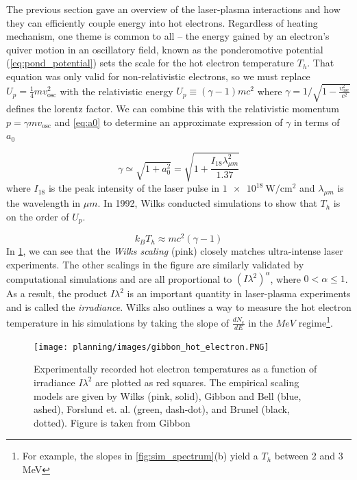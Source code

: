 The previous section gave an overview of the laser-plasma interactions and how they can efficiently couple energy into hot electrons. Regardless of heating mechanism, one theme is common to all -- the energy gained by an electron's quiver motion in an oscillatory field, known as the ponderomotive potential (\cref{eq:pond_potential}) sets the scale for the hot electron temperature $T_h$. That equation was only valid for non-relativistic electrons, so we must replace $U_p = \frac{1}{4} m v_\text{osc}^2$ with the relativistic energy $U_p \equiv (\gamma - 1) m c^2$ where $\gamma = 1 / \sqrt{1 - \frac{v_\text{osc}^2}{c^2}}$ defines the lorentz factor. We can combine this with the relativistic momentum $p = \gamma m v_\text{osc}$ and \cref{eq:a0} to determine an approximate expression of $\gamma$ in terms of $a_0$
	
\begin{equation}
	\gamma \simeq \sqrt{1 + a_0^2} = \sqrt{1 + \frac{I_{18} \lambda_{\mu m}^2}{1.37}} \label{eq:gamma}
\end{equation}
where $I_{18}$ is the peak intensity of the laser pulse in $\SI{1e18}{\watt \per \centi \meter \squared}$ and $\lambda_{\mu m}$ is the wavelength in $\mu m$. In 1992, Wilks \cite{Wilks_1992_PRL} conducted simulations to show that $T_h$ is on the order of $U_p$. 

\begin{equation}
	k_B T_h \approx m c^2 (\gamma - 1) \label{eq:wilks}
\end{equation}
In \cref{fig:electron_scaling}, we can see that the \emph{Wilks scaling} (pink) closely matches ultra-intense laser experiments. The other scalings in the figure are similarly validated by computational simulations and are all proportional to $(I \lambda^2)^\alpha$, where $0 < \alpha \leq 1$. As a result, the product $I \lambda^2$ is an important quantity in laser-plasma experiments and is called the \emph{irradiance}. Wilks also outlines a way to measure the hot electron temperature in his simulations \cite{Wilks_1992_PRL} by taking the slope of $\frac{dN_e}{dE}$ in the $MeV$ regime\footnote{For example, the slopes in \autoref{fig:sim_spectrum}(b) yield a $T_h$ between 2 and 3 MeV}.

\begin{figure}
	\centering 
	\texttt{[image: planning/images/gibbon\_hot\_electron.PNG]}
	\caption{Experimentally recorded hot electron temperatures as a function of irradiance $I \lambda^2$ are plotted as red squares. The empirical scaling models are given by Wilks \cite{Wilks_1992_PRL}(pink, solid), Gibbon and Bell \cite{Gibbon_1992_PRL}(blue, ashed), Forslund et. al. \cite{Forslund_1977_PRL}(green, dash-dot), and Brunel \cite{Brunel_1987_PRL}(black, dotted). Figure is taken from Gibbon \cite{Gibbon_2005_Plasma}}
	\label{fig:electron_scaling}
\end{figure}


